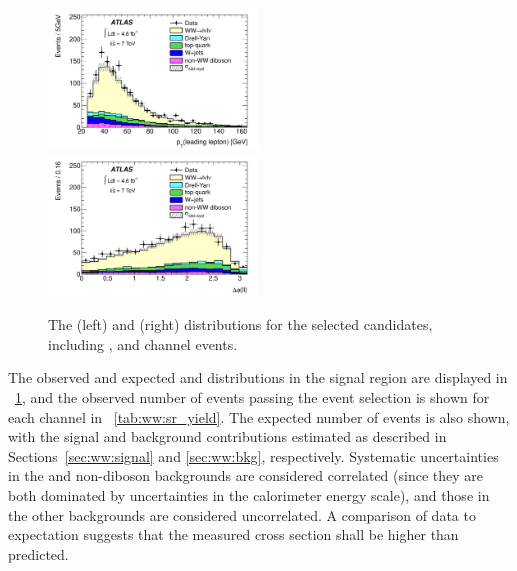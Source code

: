 \begin{figure}[t]
	\includegraphics[width=0.495\textwidth]{tex/ww/ww_ptleadlep}
	\hfill
	\includegraphics[width=0.495\textwidth]{tex/ww/ww_dphill}
	\caption{The \ptleadlep (left) and \dphill (right) distributions for the selected \WW 
	candidates, including \emch, \eech and \mmch channel events.}
	\label{fig:ww_meas:sr_plots}
\end{figure}

The observed and expected \ptleadlep and \dphill distributions in the signal region are 
displayed in \Figure~\ref{fig:ww_meas:sr_plots}, and the observed number of events passing 
the event selection is shown for each channel in 
\Table~\ref{tab:ww:sr_yield}. The expected number of events is also shown, with the 
signal and background contributions estimated as described in 
Sections~\ref{sec:ww:signal} and \ref{sec:ww:bkg}, respectively. Systematic uncertainties 
in the \DY and non-\WW diboson backgrounds are considered correlated (since they are both 
dominated by uncertainties in the calorimeter energy scale), and those in the other 
backgrounds are considered uncorrelated. A comparison of data to expectation suggests that 
the measured cross section shall be higher than predicted.

